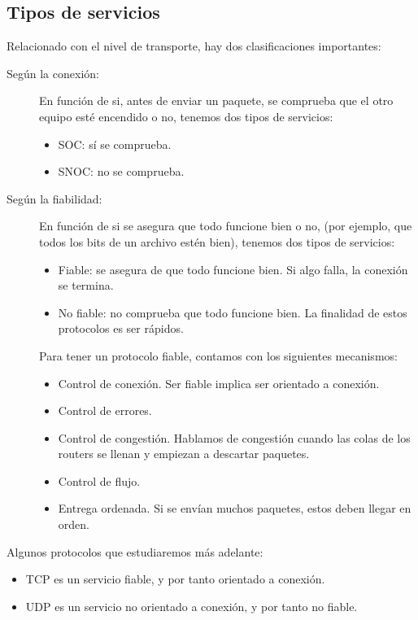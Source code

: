 
\subsection{Tipos de servicios}
Relacionado con el nivel de transporte, hay dos clasificaciones importantes:
\begin{description}
    \item[Según la conexión:] En función de si, antes de enviar un paquete, se comprueba que el otro equipo esté encendido o no, tenemos dos tipos de servicios:
    \begin{itemize}
        \item \acrfull{SOC}: sí se comprueba.
        \item \acrfull{SNOC}: no se comprueba.
    \end{itemize}

    \item[Según la fiabilidad:] En función de si se asegura que todo funcione bien o no, (por ejemplo, que todos los bits de un archivo estén bien), tenemos dos tipos de servicios:
    \begin{itemize}
        \item Fiable: se asegura de que todo funcione bien. Si algo falla, la conexión se termina.
        \item No fiable: no comprueba que todo funcione bien. La finalidad de estos protocolos es ser rápidos.
    \end{itemize}

    Para tener un protocolo fiable, contamos con los siguientes mecanismos:
    \begin{itemize}
        \item Control de conexión. Ser fiable implica ser orientado a conexión.
        \item Control de errores.
        \item Control de congestión. Hablamos de congestión cuando las colas de los routers se llenan y empiezan a descartar paquetes.
        \item Control de flujo.
        \item Entrega ordenada. Si se envían muchos paquetes, estos deben llegar en orden.
    \end{itemize}
\end{description}

    Algunos protocolos que estudiaremos más adelante: 
    \begin{itemize}
        \item \acrshort{TCP} es un servicio fiable, y por tanto orientado a conexión.
        \item \acrshort{UDP} es un servicio no orientado a conexión, y por tanto no fiable.
    \end{itemize}



